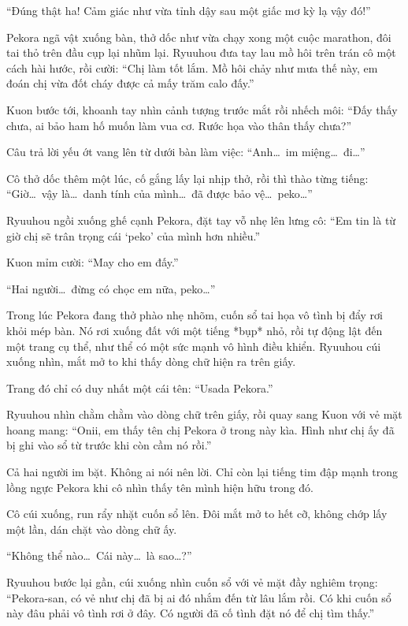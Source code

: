 \documentclass[../main.tex]{subfiles}
\begin{document}
``Đúng thật ha! Cảm giác như vừa tỉnh dậy sau một giấc mơ kỳ lạ vậy đó!''

Pekora ngã vật xuống bàn, thở dốc như vừa chạy xong một cuộc marathon, đôi tai thỏ trên đầu cụp lại nhũm lại. Ryuuhou đưa tay lau mồ hôi trên trán cô một cách hài hước, rồi cười: ``Chị làm tốt lắm. Mồ hôi chảy như mưa thế này, em đoán chị vừa đốt cháy được cả mấy trăm calo đấy.''

Kuon bước tới, khoanh tay nhìn cảnh tượng trước mắt rồi nhếch môi: ``Đấy thấy chưa, ai bảo ham hố muốn làm vua cơ. Rước họa vào thân thấy chưa?''


Câu trả lời yếu ớt vang lên từ dưới bàn làm việc: ``Anh\dots\ im miệng\dots\ đi\dots''

Cô thở dốc thêm một lúc, cố gắng lấy lại nhịp thở, rồi thì thào từng tiếng: ``Giờ\dots\ vậy là\dots\ danh tính của mình\dots\ đã được bảo vệ\dots\ peko\dots''

Ryuuhou ngồi xuống ghế cạnh Pekora, đặt tay vỗ nhẹ lên lưng cô: ``Em tin là từ giờ chị sẽ trân trọng cái `peko' của mình hơn nhiều.''

Kuon mỉm cười: ``May cho em đấy.''

``Hai người\dots\ đừng có chọc em nữa, peko\dots''

Trong lúc Pekora đang thở phào nhẹ nhõm, cuốn sổ tai họa vô tình bị đẩy rơi khỏi mép bàn. Nó rơi xuống đất với một tiếng *bụp* nhỏ, rồi tự động lật đến một trang cụ thể, như thể có một sức mạnh vô hình điều khiển. Ryuuhou cúi xuống nhìn, mắt mở to khi thấy dòng chữ hiện ra trên giấy.

Trang đó chỉ có duy nhất một cái tên: ``Usada Pekora.''

Ryuuhou nhìn chằm chằm vào dòng chữ trên giấy, rồi quay sang Kuon với vẻ mặt hoang mang: ``Onii, em thấy tên chị Pekora ở trong này kìa. Hình như chị ấy đã bị ghi vào sổ từ trước khi còn cầm nó rồi.''

Cả hai người im bặt. Không ai nói nên lời. Chỉ còn lại tiếng tim đập mạnh trong lồng ngực Pekora khi cô nhìn thấy tên mình hiện hữu trong đó.


Cô cúi xuống, run rẩy nhặt cuốn sổ lên. Đôi mắt mở to hết cỡ, không chớp lấy một lần, dán chặt vào dòng chữ ấy.

``Không thể nào\dots\ Cái này\dots\ là sao\dots?''

Ryuuhou bước lại gần, cúi xuống nhìn cuốn sổ với vẻ mặt đầy nghiêm trọng: ``Pekora-san, có vẻ như chị đã bị ai đó nhắm đến từ lâu lắm rồi. Có khi cuốn sổ này đâu phải vô tình rơi ở đây. Có người đã cố tình đặt nó để chị tìm thấy.''
\end{document}
